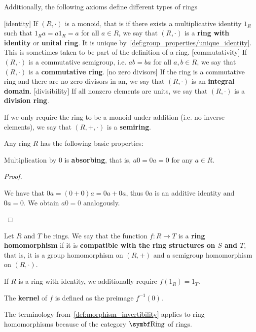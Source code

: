 \begin{definition}
  Additionally, the following axioms define different types of rings
  \begin{description}
    [identity] If \( (R, \cdot) \) is a monoid, that is if there exists a multiplicative identity \( 1_R \) such that \( 1_R a = a1_R = a \) for all \( a \in R \), we say that \( (R, \cdot) \) is a \textbf{ring with identity} or \textbf{unital ring}. It is unique by~\cref{def:group_properties/unique_identity}. This is sometimes taken to be part of the definition of a ring.
    [commutativity] If \( (R, \cdot) \) is a commutative semigroup, i.e. \( ab = ba \) for all \( a, b \in R \), we say that \( (R, \cdot) \) is a \textbf{commutative ring}.
    [no zero divisors] If the ring is a commutative ring and there are no zero divisors in an, we say that \( (R, \cdot) \) is an \textbf{integral domain}.
    [divisibility] If all nonzero elements are units, we say that \( (R, \cdot) \) is a \textbf{division ring}.
  \end{description}

  If we only require the ring to be a monoid under addition (i.e. no inverse elements), we say that \( (R, +, \cdot) \) is a \textbf{semiring}.
\end{definition}

\begin{proposition}\label{def:ring_properties}
  Any ring \( R \) has the following basic properties:
  \begin{defenum}
     Multiplication by \( 0 \) is \textbf{absorbing}, that is, \( a0 = 0a = 0 \) for any \( a \in R \).
  \end{defenum}
\end{proposition}
\begin{proof}\mbox{}
  \begin{itemize}
     We have that \( 0a = (0 + 0)a = 0a + 0a \), thus \( 0a \) is an additive identity and \( 0a = 0 \). We obtain \( a0 = 0 \) analogously.
  \end{itemize}
\end{proof}

\begin{definition}\label{def:ring_homomorphism}
  Let \( R \) and \( T \) be rings. We say that the function \( f: R \to T \) is a \textbf{ring homomorphism} if it is \textbf{compatible with the ring structures on \( S \) and \( T \)}, that is, it is a group homomorphism on \( (R, +) \) and a semigroup homomorphism on \( (R, \cdot) \).

  If \( R \) is a ring with identity, we additionally require \( f(1_R) = 1_T \).

  The \textbf{kernel} of \( f \) is defined as the preimage \( f^{-1}(0) \).

  The terminology from~\cref{def:morphism_invertibility} applies to ring homomorphisms because of the category \( \Bold{Ring} \) of rings.
\end{definition}

